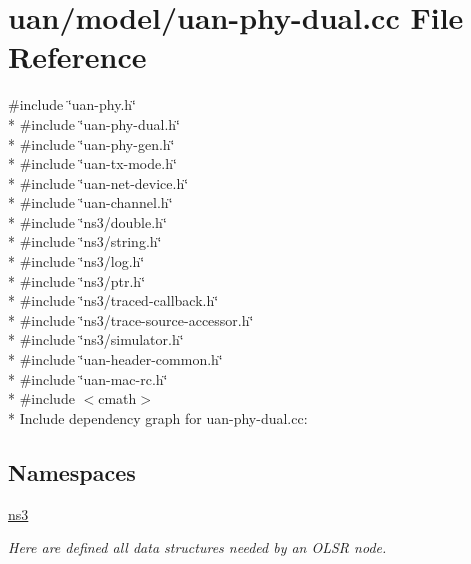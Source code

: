 \hypertarget{uan-phy-dual_8cc}{}\section{uan/model/uan-\/phy-\/dual.cc File Reference}
\label{uan-phy-dual_8cc}
{\ttfamily \#include \char`\"{}uan-\/phy.\+h\char`\"{}}\\*
{\ttfamily \#include \char`\"{}uan-\/phy-\/dual.\+h\char`\"{}}\\*
{\ttfamily \#include \char`\"{}uan-\/phy-\/gen.\+h\char`\"{}}\\*
{\ttfamily \#include \char`\"{}uan-\/tx-\/mode.\+h\char`\"{}}\\*
{\ttfamily \#include \char`\"{}uan-\/net-\/device.\+h\char`\"{}}\\*
{\ttfamily \#include \char`\"{}uan-\/channel.\+h\char`\"{}}\\*
{\ttfamily \#include \char`\"{}ns3/double.\+h\char`\"{}}\\*
{\ttfamily \#include \char`\"{}ns3/string.\+h\char`\"{}}\\*
{\ttfamily \#include \char`\"{}ns3/log.\+h\char`\"{}}\\*
{\ttfamily \#include \char`\"{}ns3/ptr.\+h\char`\"{}}\\*
{\ttfamily \#include \char`\"{}ns3/traced-\/callback.\+h\char`\"{}}\\*
{\ttfamily \#include \char`\"{}ns3/trace-\/source-\/accessor.\+h\char`\"{}}\\*
{\ttfamily \#include \char`\"{}ns3/simulator.\+h\char`\"{}}\\*
{\ttfamily \#include \char`\"{}uan-\/header-\/common.\+h\char`\"{}}\\*
{\ttfamily \#include \char`\"{}uan-\/mac-\/rc.\+h\char`\"{}}\\*
{\ttfamily \#include $<$cmath$>$}\\*
Include dependency graph for uan-\/phy-\/dual.cc\+:
\subsection*{Namespaces}
\begin{DoxyCompactItemize}
\item 
 \hyperlink{namespacens3}{ns3}
\begin{DoxyCompactList}\small\item\em Here are defined all data structures needed by an O\+L\+SR node. \end{DoxyCompactList}\end{DoxyCompactItemize}
